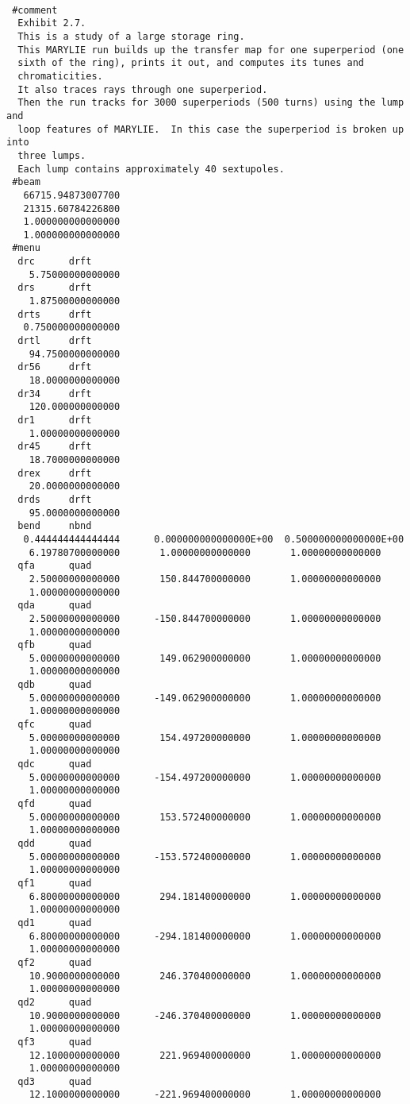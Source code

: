 {
\footnotesize\tt
\begin{verbatim}
 #comment
  Exhibit 2.7.
  This is a study of a large storage ring.
  This MARYLIE run builds up the transfer map for one superperiod (one
  sixth of the ring), prints it out, and computes its tunes and
  chromaticities.
  It also traces rays through one superperiod.
  Then the run tracks for 3000 superperiods (500 turns) using the lump and
  loop features of MARYLIE.  In this case the superperiod is broken up into
  three lumps.
  Each lump contains approximately 40 sextupoles.
 #beam
   66715.94873007700
   21315.60784226800
   1.000000000000000
   1.000000000000000
 #menu
  drc      drft
    5.75000000000000
  drs      drft
    1.87500000000000
  drts     drft
   0.750000000000000
  drtl     drft
    94.7500000000000
  dr56     drft
    18.0000000000000
  dr34     drft
    120.000000000000
  dr1      drft
    1.00000000000000
  dr45     drft
    18.7000000000000
  drex     drft
    20.0000000000000
  drds     drft
    95.0000000000000
  bend     nbnd
   0.444444444444444      0.000000000000000E+00  0.500000000000000E+00
    6.19780700000000       1.00000000000000       1.00000000000000
  qfa      quad
    2.50000000000000       150.844700000000       1.00000000000000
    1.00000000000000
  qda      quad
    2.50000000000000      -150.844700000000       1.00000000000000
    1.00000000000000
  qfb      quad
    5.00000000000000       149.062900000000       1.00000000000000
    1.00000000000000
  qdb      quad
    5.00000000000000      -149.062900000000       1.00000000000000
    1.00000000000000
  qfc      quad
    5.00000000000000       154.497200000000       1.00000000000000
    1.00000000000000
  qdc      quad
    5.00000000000000      -154.497200000000       1.00000000000000
    1.00000000000000
  qfd      quad
    5.00000000000000       153.572400000000       1.00000000000000
    1.00000000000000
  qdd      quad
    5.00000000000000      -153.572400000000       1.00000000000000
    1.00000000000000
  qf1      quad
    6.80000000000000       294.181400000000       1.00000000000000
    1.00000000000000
  qd1      quad
    6.80000000000000      -294.181400000000       1.00000000000000
    1.00000000000000
  qf2      quad
    10.9000000000000       246.370400000000       1.00000000000000
    1.00000000000000
  qd2      quad
    10.9000000000000      -246.370400000000       1.00000000000000
    1.00000000000000
  qf3      quad
    12.1000000000000       221.969400000000       1.00000000000000
    1.00000000000000
  qd3      quad
    12.1000000000000      -221.969400000000       1.00000000000000

\end{verbatim}}

